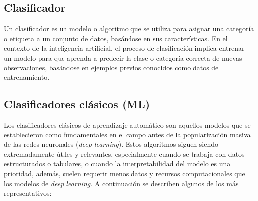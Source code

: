 \subsection{Clasificador}

Un clasificador es un modelo o algoritmo que se utiliza para asignar una categoría o etiqueta a un conjunto de datos, basándose en sus características. En el contexto de la inteligencia artificial, el proceso de clasificación implica entrenar un modelo para que aprenda a predecir la clase o categoría correcta de nuevas observaciones, basándose en ejemplos previos conocidos como datos de entrenamiento.

\subsection{Clasificadores clásicos (ML)}

Los clasificadores clásicos de aprendizaje automático son aquellos modelos que se establecieron como fundamentales en el campo antes de la popularización masiva de las redes neuronales (\textit{deep learning}). Estos algoritmos siguen siendo extremadamente útiles y relevantes, especialmente cuando se trabaja con datos estructurados o tabulares, o cuando la interpretabilidad del modelo es una prioridad, además, suelen requerir menos datos y recursos computacionales que los modelos de \textit{deep learning}. A continuación se describen algunos de los más representativos:

